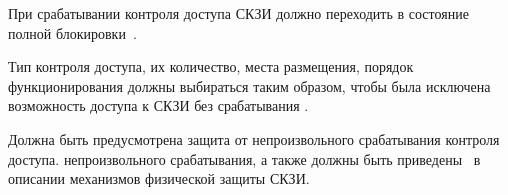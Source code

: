 \label{R.PS.Erasing} %
При срабатывании  контроля доступа СКЗИ должно 
переходить в состояние полной блокировки~.
%

\label{R.PS.SensorsQuality} %
Тип  контроля доступа, их количество, места 
размещения, порядок функционирования должны выбираться таким образом, 
чтобы была исключена возможность доступа к  СКЗИ без срабатывания .

\label{R.PS.SensorsFaults} %
Должна быть предусмотрена защита от непроизвольного срабатывания  
контроля доступа.  непроизвольного 
срабатывания, а также  должны 
быть приведены~ в описании механизмов физической защиты СКЗИ. 

